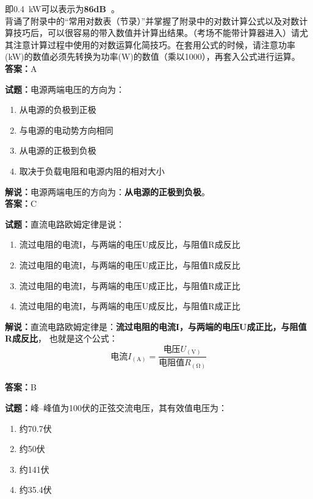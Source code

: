\documentclass{ctexbook}
\begin{document}
即\qty{0.4}{\kW}可以表示为\textbf{\num{86}\unit[qualifier-mode=combine]{\deci\bel{}}}。\\背诵了附录中的“常用对数表（节录）”并掌握了附录中的对数计算公式以及对数计算技巧后，可以很容易的带入数值并计算出结果。（考场不能带计算器进入）请尤其注意计算过程中使用的对数运算化简技巧。在套用公式的时候，请注意功率(\unit{\kW})的数值必须先转换为功率(\unit{\watt})的数值（乘以\num{1000}），再套入公式进行运算。\\\noindent\textbf{答案：}A

\bigskip

\noindent\textbf{试题：}电源两端电压的方向为：

\begin{enumerate}[leftmargin=3em]
  \item 从电源的负极到正极
  \item 与电源的电动势方向相同
  \item 从电源的正极到负极
  \item 取决于负载电阻和电源内阻的相对大小
\end{enumerate}

\noindent\textbf{解说：}电源两端电压的方向为：\textbf{从电源的正极到负极}。\\\noindent\textbf{答案：}C

\bigskip

\noindent\textbf{试题：}直流电路欧姆定律是说：

\begin{enumerate}[leftmargin=3em]
  \item 流过电阻的电流I，与两端的电压U成反比，与阻值R成反比
  \item 流过电阻的电流I，与两端的电压U成正比，与阻值R成反比
  \item 流过电阻的电流I，与两端的电压U成正比，与阻值R成正比
  \item 流过电阻的电流I，与两端的电压U成反比，与阻值R成正比
\end{enumerate}

\noindent\textbf{解说：}直流电路欧姆定律是：\textbf{流过电阻的电流I，与两端的电压U成正比，与阻值R成反比}，
也就是这个公式：
\[\mbox{电流}I_{(\unit{\ampere})} = \frac{\mbox{电压}U_{(\unit{\volt})}}{\mbox{电阻值}R_{(\unit{\ohm})}}\]
\\\noindent\textbf{答案：}B

\bigskip

\noindent\textbf{试题：}峰--峰值为100伏的正弦交流电压，其有效值电压为：
\begin{enumerate}[leftmargin=3em]
  \item 约70.7伏
  \item 约50伏
  \item 约141伏
  \item 约35.4伏
\end{enumerate}
\end{document}
